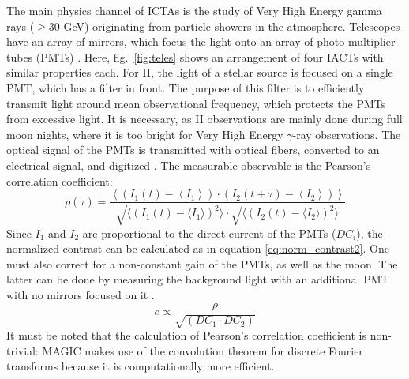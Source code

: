 The main physics channel of ICTAs is the study of Very High Energy gamma rays ($\geq 30$ GeV) originating from particle showers in the atmosphere. Telescopes have an array of mirrors, which focus the light onto an array of photo-multiplier tubes (PMTs) \cite{aleksic2016major}. Here, fig.~\ref{fig:teles} shows an arrangement of four IACTs with similar properties each. For II, the light of a stellar source is focused on a single PMT, which has a filter in front. The purpose of this filter is to efficiently transmit light around mean observational frequency, which protects the PMTs from excessive light. It is necessary, as II observations are mainly done during full moon nights, where it is too bright for Very High Energy $\gamma$-ray observations. The optical signal of the PMTs is transmitted with optical fibers, converted to an electrical signal, and digitized \cite{acciari2020optical}. The measurable observable is the Pearson's correlation coefficient:
\begin{equation}
	\rho(\tau) = \frac{\left\langle \left( I_1(t) - \left\langle I_1 \right\rangle \right) \cdot \left( I_2(t + \tau) - \left\langle I_2 \right\rangle \right) \right\rangle}{\sqrt{\langle \left( I_1(t) - \langle I_1 \rangle \right)^2 \rangle} \cdot \sqrt{\langle \left( I_2(t) - \langle I_2 \rangle \right) ^2 \rangle}}
	\label{eqn:pearson}
\end{equation}
Since $I_1$ and $I_2$ are proportional to the direct current of the PMTs ($DC_i$), the normalized contrast can be calculated as in equation \ref{eq:norm_contrast2}. One must also correct for a non-constant gain of the PMTs, as well as the moon. The latter can be done by measuring the background light with an additional PMT with no mirrors focused on it \cite{acciari2020optical}. 
\begin{equation}
	c \propto \frac{\rho}{\sqrt{\left(DC_1 \cdot DC_2 \right)}}
	\label{eq:norm_contrast2}
\end{equation}
It must be noted that the calculation of Pearson's correlation coefficient is non-trivial: MAGIC makes use of the convolution theorem for discrete Fourier transforms because it is computationally more efficient.

